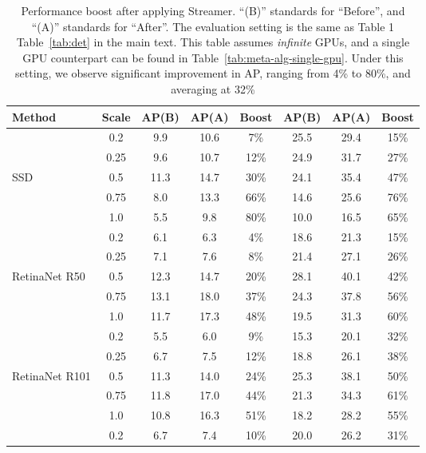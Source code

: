 \begin{table*}[]
\small
\centering
\caption{Performance boost after applying Streamer. ``(B)'' standards for ``Before'', and ``(A)'' standards for ``After''. The evaluation setting is the same as
\ifstandalonesupplement
    Table 1 
\else
    Table~\ref{tab:det}
\fi
in the main text. This table assumes {\em infinite} GPUs, and a single GPU counterpart can be found in Table~\ref{tab:meta-alg-single-gpu}. Under this setting, we observe significant improvement in AP, ranging from 4\% to 80\%, and averaging at 32\%
}
\label{tab:meta-alg-inf-gpu} 
\addtolength{\tabcolsep}{0.2em}
\vspace{-0.5em}
\begin{tabular}{lccccccc}
\toprule
Method & Scale & AP(B) & AP(A) & Boost & AP(B) & AP(A) & Boost \\
\midrule
                   & 0.2  & 9.9  & 10.6 & 7\%  & 25.5 & 29.4 & 15\% \\
                   & 0.25 & 9.6  & 10.7 & 12\% & 24.9 & 31.7 & 27\% \\
SSD                & 0.5  & 11.3 & 14.7 & 30\% & 24.1 & 35.4 & 47\% \\
                   & 0.75 & 8.0  & 13.3 & 66\% & 14.6 & 25.6 & 76\% \\
                   & 1.0  & 5.5  & 9.8  & 80\% & 10.0 & 16.5 & 65\% \\
\midrule
                   & 0.2  & 6.1  & 6.3  & 4\%  & 18.6 & 21.3 & 15\% \\
                   & 0.25 & 7.1  & 7.6  & 8\%  & 21.4 & 27.1 & 26\% \\
RetinaNet R50      & 0.5  & 12.3 & 14.7 & 20\% & 28.1 & 40.1 & 42\% \\
                   & 0.75 & 13.1 & 18.0 & 37\% & 24.3 & 37.8 & 56\% \\
                   & 1.0  & 11.7 & 17.3 & 48\% & 19.5 & 31.3 & 60\% \\
\midrule
                   & 0.2  & 5.5  & 6.0  & 9\%  & 15.3 & 20.1 & 32\% \\
                   & 0.25 & 6.7  & 7.5  & 12\% & 18.8 & 26.1 & 38\% \\
RetinaNet R101     & 0.5  & 11.3 & 14.0 & 24\% & 25.3 & 38.1 & 50\% \\
                   & 0.75 & 11.8 & 17.0 & 44\% & 21.3 & 34.3 & 61\% \\
                   & 1.0  & 10.8 & 16.3 & 51\% & 18.2 & 28.2 & 55\% \\
\midrule
                   & 0.2  & 6.7  & 7.4  & 10\% & 20.0 & 26.2 & 31\% \\

\end{tabular}
\end{table*}

